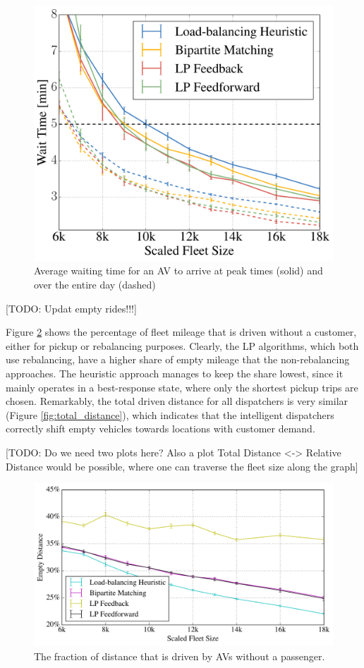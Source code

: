 \begin{figure}
\includegraphics[width=1.0\textwidth]{figures/mean_peak_waiting_times.pdf}
\caption{Average waiting time for an AV to arrive at peak times (solid) and over the entire day (dashed)}
\label{fig:mean_peak_waiting_times}
\end{figure}

[TODO: Updat empty rides!!!]

Figure \ref{fig:empty_rides} shows the percentage of fleet mileage that is driven
without a customer, either for pickup or rebalancing purposes. Clearly, the LP
algorithms, which both use rebalancing, have a higher share of empty mileage
that the non-rebalancing approaches. The heuristic approach manages to keep the
share lowest, since it mainly operates in a best-response state, where only the
shortest pickup trips are chosen. Remarkably, the total driven distance for all
dispatchers is very similar (Figure \ref{fig:total_distance}), which indicates that the intelligent dispatchers correctly shift empty vehicles towards locations with customer demand. 

[TODO: Do we need two plots here? Also a plot Total Distance <-> Relative Distance
would be possible, where one can traverse the fleet size along the graph]

\begin{figure}
\includegraphics[width=1.0\textwidth]{figures/empty_rides.pdf}
\caption{The fraction of distance that is driven by AVs without a passenger.}
\label{fig:empty_rides}
\end{figure}

